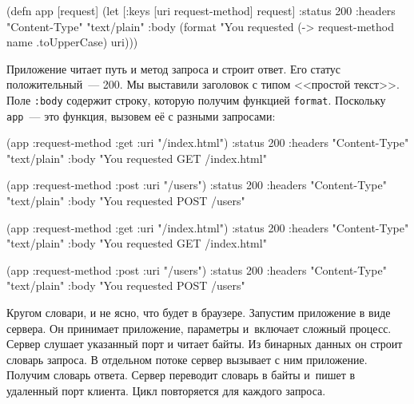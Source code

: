 \else

\begin{english}
  \begin{clojure}
(defn app [request]
  (let [{:keys [uri request-method]} request]
    {:status 200
     :headers {"Content-Type" "text/plain"}
     :body (format "You requested %
                   (-> request-method name .toUpperCase)
                   uri)}))
  \end{clojure}
\end{english}

\fi

Приложение читает путь и метод запроса и строит ответ. Его статус
положительный~--- 200. Мы выставили заголовок с типом <<простой текст>>. Поле
\verb|:body| содержит строку, которую получим функцией
\verb|format|. Поскольку \verb|app|~--- это функция, вызовем её с разными
запросами:

\ifx\devicetype\mobile

\begin{english}
  \begin{clojure}
(app {:request-method :get
      :uri "/index.html"})
{:status 200
 :headers {"Content-Type" "text/plain"}
 :body "You requested GET /index.html"}

(app {:request-method :post
      :uri "/users"})
{:status 200
 :headers {"Content-Type" "text/plain"}
 :body "You requested POST /users"}
  \end{clojure}
\end{english}

\else

\begin{english}
  \begin{clojure}
(app {:request-method :get :uri "/index.html"})
{:status 200
 :headers {"Content-Type" "text/plain"}
 :body "You requested GET /index.html"}

(app {:request-method :post :uri "/users"})
{:status 200
 :headers {"Content-Type" "text/plain"}
 :body "You requested POST /users"}
  \end{clojure}
\end{english}

\fi


Кругом словари, и не ясно, что будет в браузере. Запустим приложение в виде
сервера. Он принимает приложение, параметры и~включает сложный процесс. Сервер
слушает указанный порт и читает байты. Из бинарных данных он строит словарь
запроса. В отдельном потоке сервер вызывает с ним приложение. Получим словарь
ответа. Сервер переводит словарь в байты и~пишет в удаленный порт клиента. Цикл
повторяется для каждого запроса.

